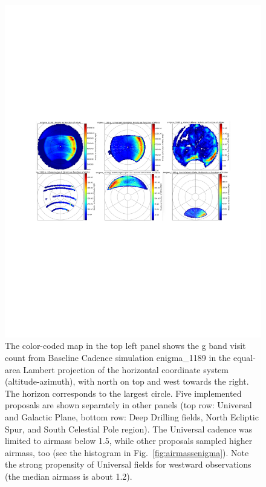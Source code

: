 \documentclass[manuscript]{article}
\begin{document}
\begin{figure}[t!]
\vskip -3.5in
\hskip -0.5in
\includegraphics[angle=0,width=1.19\hsize,clip]{aaAllp.pdf}
\vskip -3.5in
\caption{The color-coded map in the top left panel shows the g band visit count from 
Baseline Cadence simulation enigma\_1189 in the equal-area Lambert projection of the
horizontal coordinate system (altitude-azimuth), with north on top and west towards the 
right. The horizon corresponds to the largest circle. Five implemented proposals are shown 
separately in other panels (top row: Universal and Galactic Plane, bottom row: Deep Drilling 
fields, North Ecliptic Spur, and South Celestial Pole region). The Universal cadence was 
limited to airmass below 1.5, while other proposals sampled higher airmass, too (see the 
histogram in Fig.~\ref{fig:airmassenigma}).  Note the strong propensity of Universal fields 
for westward observations (the median airmass is about 1.2).} 
\label{fig:AltAzenigma}
\end{figure}
\end{document}
